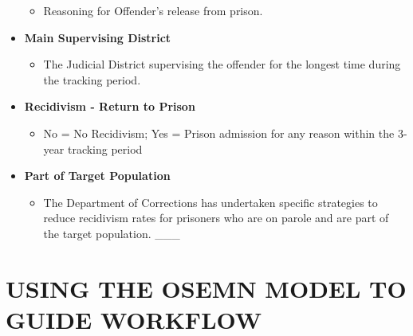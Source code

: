 \documentclass[11pt]{article}
\providecommand{\tightlist}{%
      \setlength{\itemsep}{0pt}\setlength{\parskip}{0pt}}
\begin{document}
\begin{itemize}
  \begin{itemize}
  \tightlist
  \item
    Reasoning for Offender's release from prison.
  \end{itemize}
\item
  \textbf{Main Supervising District}

  \begin{itemize}
  \tightlist
  \item
    The Judicial District supervising the offender for the longest time
    during the tracking period.
  \end{itemize}
\item
  \textbf{Recidivism - Return to Prison}

  \begin{itemize}
  \tightlist
  \item
    No = No Recidivism; Yes = Prison admission for any reason within the
    3-year tracking period
  \end{itemize}
\item
  \textbf{Part of Target Population}

  \begin{itemize}
  \tightlist
  \item
    The Department of Corrections has undertaken specific strategies to
    reduce recidivism rates for prisoners who are on parole and are part
    of the target population. \_\_\_
  \end{itemize}
\end{itemize}

    \hypertarget{using-the-osemn-model-to-guide-workflow}{%
\section{USING THE OSEMN MODEL TO GUIDE
WORKFLOW}\label{using-the-osemn-model-to-guide-workflow}}
\end{document}
